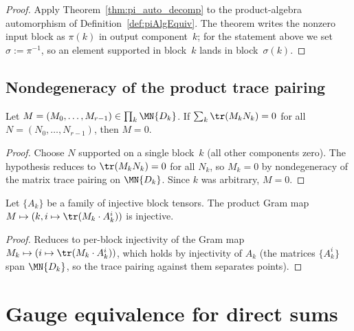 \begin{proof}\leanok{}
    Apply Theorem~\ref{thm:pi_auto_decomp} to the product-algebra
    automorphism of Definition~\ref{def:piAlgEquiv}. The theorem writes the
    nonzero input block as $\pi(k)$ in output component~$k$; for the statement
    above we set $\sigma := \pi^{-1}$, so an element supported in block~$k$
    lands in block~$\sigma(k)$.
\end{proof}

\subsection{Nondegeneracy of the product trace pairing}

\begin{lemma}%
    \label{lem:piTrace_mul_right_eq_zero}
    \leanok
    Let $M = (M_0, \ldots, M_{r-1}) \in \prod_{k} \MN{D_k}$.
    If $\sum_{k} \tr(M_k N_k) = 0$ for all
    $N = (N_0, \ldots, N_{r-1})$, then $M = 0$.
\end{lemma}

\begin{proof}\leanok
    Choose $N$ supported on a single block~$k$ (all other components
    zero).
    The hypothesis reduces to $\tr(M_k N_k) = 0$ for all $N_k$, so
    $M_k = 0$ by nondegeneracy of the matrix trace pairing on
    $\MN{D_k}$.
    Since $k$ was arbitrary, $M = 0$.
\end{proof}

\begin{lemma}%
    \label{lem:piTraceMulRightPi_ker_eq_bot}
    \leanok
    Let $\{A_k\}$ be a family of injective block tensors.
    The product Gram map
    $M \mapsto (k, i \mapsto \tr(M_k \cdot A_k^i))$
    is injective.
\end{lemma}

\begin{proof}\leanok{}
    Reduces to per-block injectivity of the Gram map
    $M_k \mapsto (i \mapsto \tr(M_k \cdot A_k^i))$, which holds by
    injectivity of $A_k$ (the matrices $\{A_k^i\}$ span $\MN{D_k}$,
    so the trace pairing against them separates points).
\end{proof}

\section{Gauge equivalence for direct sums}%
\label{sec:multi_block_ft}

